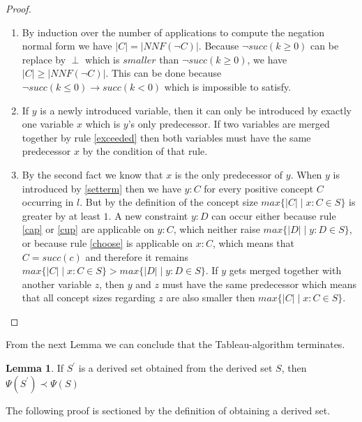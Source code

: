 \documentclass[a4paper,11pt]{scrartcl}
\theoremstyle{break}
\theoremstyle{definition}
\newtheorem{mylem}{Lemma}
\begin{document}
\begin{proof}$ $\\
\vspace*{-5mm}
\begin{enumerate}
\item By induction over the number of applications to compute the negation normal form we have $|C|=|NNF(\neg C)|$. Because $\neg succ(k\geq0)$ can be replace by $\perp$ which is $smaller$ than $\neg succ(k\geq 0)$, we have $|C|\geq|NNF(\neg C)|$. This can be done because $\neg succ(k\leq 0)\rightarrow succ(k<0)$ which is impossible to satisfy.
\item If $y$ is a newly introduced variable, then it can only be introduced by exactly one variable $x$ which is $y$'s only predecessor. If two variables are merged together by rule \ref{exceeded} then both variables must have the same predecessor $x$ by the condition of that rule.
\item By the second fact we know that $x$ is the only predecessor of $y$. When $y$ is introduced by \ref{setterm} then we have $y:C$ for every positive concept $C$ occurring in $l$. But by the definition of the concept size $max\{|C|\mid x:C\in S\}$ is greater by at least $1$. A new constraint $y:D$ can occur either because rule \ref{cap} or \ref{cup} are applicable on $y:C$, which neither raise $max\{|D|\mid y:D \in S\}$, or because rule \ref{choose} is applicable on $x:C$, which means that $C=succ(c)$ and therefore it remains $max\{|C|\mid x:C\in S\}>max\{|D|\mid y:D \in S\}$. If $y$ gets merged together with another variable $z$, then $y$ and $z$ must have the same predecessor which means that all concept sizes regarding $z$ are also smaller then $max\{|C|\mid x:C\in S\}$.
\end{enumerate}
\end{proof}
From the next Lemma we can conclude that the Tableau-algorithm terminates.
\begin{mylem}
If $S^\prime$ is a derived set obtained from the derived set $S$, then $\Psi(S^\prime)\prec\Psi(S)$
\end{mylem}
The following proof is sectioned by the definition of obtaining a derived set.
\end{document}
